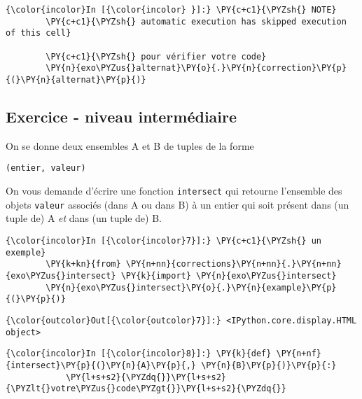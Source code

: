     \begin{Verbatim}[commandchars=\\\{\}]
{\color{incolor}In [{\color{incolor} }]:} \PY{c+c1}{\PYZsh{} NOTE}
        \PY{c+c1}{\PYZsh{} automatic execution has skipped execution of this cell}
        
        \PY{c+c1}{\PYZsh{} pour vérifier votre code}
        \PY{n}{exo\PYZus{}alternat}\PY{o}{.}\PY{n}{correction}\PY{p}{(}\PY{n}{alternat}\PY{p}{)}
\end{Verbatim}


    \hypertarget{exercice---niveau-intermuxe9diaire}{%
\subsection{Exercice - niveau
intermédiaire}\label{exercice---niveau-intermuxe9diaire}}

    On se donne deux ensembles A et B de tuples de la forme

\begin{verbatim}
(entier, valeur)
\end{verbatim}

On vous demande d'écrire une fonction \texttt{intersect} qui retourne
l'ensemble des objets \texttt{valeur} associés (dans A ou dans B) à un
entier qui soit présent dans (un tuple de) A \emph{et} dans (un tuple
de) B.

    \begin{Verbatim}[commandchars=\\\{\}]
{\color{incolor}In [{\color{incolor}7}]:} \PY{c+c1}{\PYZsh{} un exemple}
        \PY{k+kn}{from} \PY{n+nn}{corrections}\PY{n+nn}{.}\PY{n+nn}{exo\PYZus{}intersect} \PY{k}{import} \PY{n}{exo\PYZus{}intersect}
        \PY{n}{exo\PYZus{}intersect}\PY{o}{.}\PY{n}{example}\PY{p}{(}\PY{p}{)}
\end{Verbatim}


\begin{Verbatim}[commandchars=\\\{\}]
{\color{outcolor}Out[{\color{outcolor}7}]:} <IPython.core.display.HTML object>
\end{Verbatim}
            
    \begin{Verbatim}[commandchars=\\\{\}]
{\color{incolor}In [{\color{incolor}8}]:} \PY{k}{def} \PY{n+nf}{intersect}\PY{p}{(}\PY{n}{A}\PY{p}{,} \PY{n}{B}\PY{p}{)}\PY{p}{:}
            \PY{l+s+s2}{\PYZdq{}}\PY{l+s+s2}{\PYZlt{}votre\PYZus{}code\PYZgt{}}\PY{l+s+s2}{\PYZdq{}}
\end{Verbatim}


